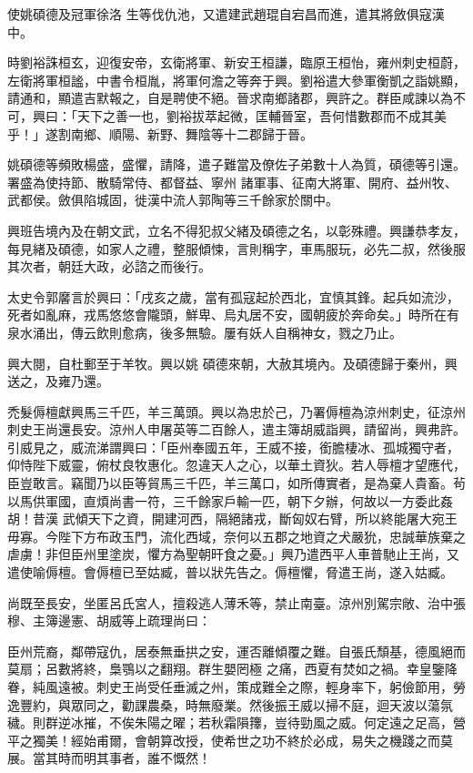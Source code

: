 \begin{pinyinscope}
 使姚碩德及冠軍徐洛
 生等伐仇池，又遣建武趙琨自宕昌而進，遣其將斂俱寇漢中。



 時劉裕誅桓玄，迎復安帝，玄衛將軍、新安王桓謙，臨原王桓怡，雍州刺史桓蔚，左衛將軍桓謐，中書令桓胤，將軍何澹之等奔于興。劉裕遣大參軍衡凱之詣姚顯，請通和，顯遣吉默報之，自是聘使不絕。晉求南鄉諸郡，興許之。群臣咸諫以為不可，興曰：「天下之善一也，劉裕拔萃起微，匡輔晉室，吾何惜數郡而不成其美乎！」遂割南鄉、順陽、新野、舞陰等十二郡歸于晉。



 姚碩德等頻敗楊盛，盛懼，請降，遣子難當及僚佐子弟數十人為質，碩德等引還。署盛為使持節、散騎常侍、都督益、寧州
 諸軍事、征南大將軍、開府、益州牧、武都侯。斂俱陷城固，徙漢中流人郭陶等三千餘家於關中。



 興班告境內及在朝文武，立名不得犯叔父緒及碩德之名，以彰殊禮。興謙恭孝友，每見緒及碩德，如家人之禮，整服傾悚，言則稱字，車馬服玩，必先二叔，然後服其次者，朝廷大政，必諮之而後行。



 太史令郭黁言於興曰：「戌亥之歲，當有孤寇起於西北，宜慎其鋒。起兵如流沙，死者如亂麻，戎馬悠悠會隴頭，鮮卑、烏丸居不安，國朝疲於奔命矣。」時所在有泉水涌出，傳云飲則愈病，後多無驗。屢有妖人自稱神女，戮之乃止。



 興大閱，自杜郵至于羊牧。興以姚
 碩德來朝，大赦其境內。及碩德歸于秦州，興送之，及雍乃還。



 禿髮傉檀獻興馬三千匹，羊三萬頭。興以為忠於己，乃署傉檀為涼州刺史，征涼州刺史王尚還長安。涼州人申屠英等二百餘人，遣主簿胡威詣興，請留尚，興弗許。引威見之，威流涕謂興曰：「臣州奉國五年，王威不接，銜膽棲冰、孤城獨守者，仰恃陛下威靈，俯杖良牧惠化。忽違天人之心，以華土資狄。若人辱檀才望應代，臣豈敢言。竊聞乃以臣等貿馬三千匹，羊三萬口，如所傳實者，是為棄人貴畜。茍以馬供軍國，直煩尚書一符，三千餘家戶輸一匹，朝下夕辦，何故以一方委此姦胡！昔漢
 武傾天下之資，開建河西，隔絕諸戎，斷匈奴右臂，所以終能屠大宛王毋寡。今陛下方布政玉門，流化西域，奈何以五郡之地資之犬嚴狁，忠誠華族棄之虐虜！非但臣州里塗炭，懼方為聖朝旰食之憂。」興乃遣西平人車普馳止王尚，又遣使喻傉檀。會傉檀已至姑臧，普以狀先告之。傉檀懼，脅遣王尚，遂入姑臧。



 尚既至長安，坐匿呂氏宮人，擅殺逃人薄禾等，禁止南臺。涼州別駕宗敞、治中張穆、主簿邊憲、胡威等上疏理尚曰：



 臣州荒裔，鄰帶寇仇，居泰無垂拱之安，運否離傾覆之難。自張氏頹基，德風絕而莫扇；呂數將終，梟鶚以之翻翔。群生嬰罔極
 之痛，西夏有焚如之禍。幸皇鑒降眷，純風遠被。刺史王尚受任垂滅之州，策成難全之際，輕身率下，躬儉節用，勞逸豐約，與眾同之，勸課農桑，時無廢業。然後振王威以掃不庭，迴天波以蕩氛穢。則群逆冰摧，不俟朱陽之曜；若秋霜隕籜，豈待勁風之威。何定遠之足高，營平之獨美！經始甫爾，會朝算改授，使希世之功不終於必成，易失之機踐之而莫展。當其時而明其事者，誰不慨然！




\end{pinyinscope}
